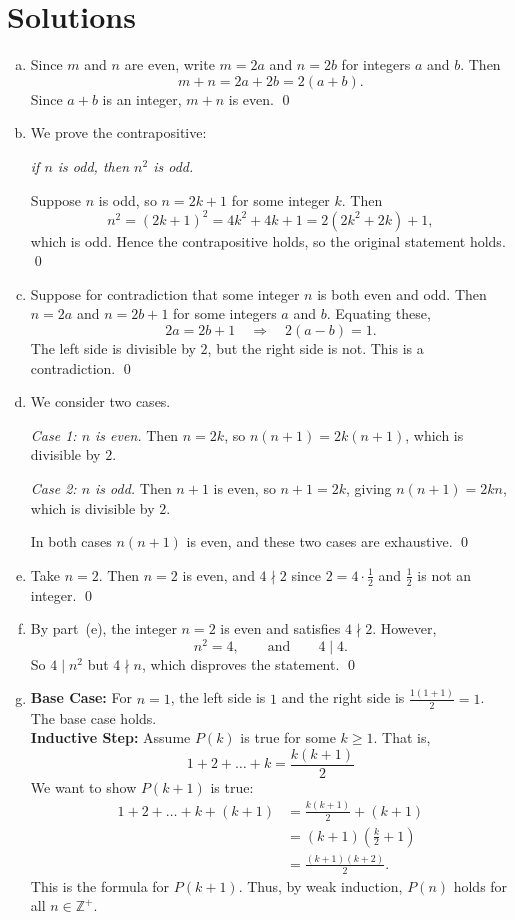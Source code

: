 \documentclass[12pt]{article}
\begin{document}
\newpage
\section*{Solutions}

\begin{enumerate}[(a)]

\item Since $m$ and $n$ are even, write $m = 2a$ and $n = 2b$
for integers $a$ and $b$.
Then
\[
  m + n = 2a + 2b = 2(a+b).
\]
Since $a + b$ is an integer, $m + n$ is even.
\qed

\item We prove the contrapositive:
\begin{center}
  \textit{if $n$ is odd, then $n^2$ is odd.}
\end{center}
Suppose $n$ is odd, so $n = 2k+1$ for some integer $k$.
Then
\[
  n^2 = (2k+1)^2 = 4k^2 + 4k + 1 = 2(2k^2+2k) + 1,
\]
which is odd.
Hence the contrapositive holds, so the original statement holds.
\qed

\item Suppose for contradiction that some integer $n$ is both even
and odd.
Then $n = 2a$ and $n = 2b+1$ for some integers $a$ and $b$.
Equating these,
\[
  2a = 2b + 1
  \quad\Longrightarrow\quad
  2(a - b) = 1.
\]
The left side is divisible by $2$, but the right side is not.
This is a contradiction.
\qed

\item We consider two cases.

\medskip
\textit{Case 1: $n$ is even.}
Then $n = 2k$, so $n(n+1) = 2k(n+1)$, which is divisible by $2$.

\medskip
\textit{Case 2: $n$ is odd.}
Then $n+1$ is even, so $n+1 = 2k$, giving $n(n+1) = 2kn$,
which is divisible by $2$.

\medskip
In both cases $n(n+1)$ is even, and these two cases are exhaustive.
\qed

\item Take $n = 2$.
Then $n = 2$ is even, and $4 \nmid 2$ since
$2 = 4 \cdot \tfrac{1}{2}$ and $\tfrac{1}{2}$ is not an integer.
\qed

\item By part~(e), the integer $n = 2$ is even and satisfies
$4 \nmid 2$.
However,
\[
  n^2 = 4, \qquad \text{and} \qquad 4 \mid 4.
\]
So $4 \mid n^2$ but $4 \nmid n$, which disproves the statement.
\qed

\item \textbf{Base Case:} For $n=1$, the left side is $1$ and the right side is $\frac{1(1+1)}{2} = 1$. The base case holds. \\
\textbf{Inductive Step:} Assume $P(k)$ is true for some $k \geq 1$. That is,
\[ 1 + 2 + \dots + k = \frac{k(k+1)}{2} \]
We want to show $P(k+1)$ is true:
\begin{align*}
1 + 2 + \dots + k + (k+1) &= \frac{k(k+1)}{2} + (k+1) \\
&= (k+1) \left( \frac{k}{2} + 1 \right) \\
&= \frac{(k+1)(k+2)}{2}.
\end{align*}
This is the formula for $P(k+1)$. Thus, by weak induction, $P(n)$ holds for all $n \in \mathbb{Z}^+$.


\end{enumerate}
\end{document}
